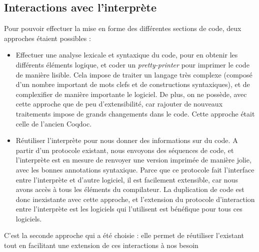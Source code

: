 \documentclass[a4paper, 11pt]{report}
\begin{document}
    \subsection{Interactions avec l'interprète}
    Pour pouvoir effectuer la mise en forme des différentes sections de code,
    deux approches étaient possibles :
      \begin{itemize}
        \item Effectuer une analyse lexicale et syntaxique du code, pour
          en obtenir les différents éléments logique, et coder un
          \textit{pretty-printer} pour imprimer le code de manière lisible.
          Cela impose de traiter un langage très complexe (composé d'un nombre
          important de mots clefs et de constructions syntaxiques), et de
          complexifier de manière importante le logiciel. De plus, on ne
          possède, avec cette approche que de peu d'extensibilité, car rajouter
          de nouveaux traitements impose de grands changements dans le code.
          Cette approche était celle de l'ancien Coqdoc.
        \item Réutiliser l'interprète pour nous donner des informations sur
          du code. A partir d'un protocole existant, nous envoyons des séquences
          de code, et l'interprète est en mesure de renvoyer une version imprimée
          de manière jolie, avec les bonnes annotations syntaxique.
          Parce que ce protocole fait l'interface entre l'interprète et d'autre
          logiciel, il est facilement extensible, car nous avons accès à tous
          les éléments du compilateur. La duplication de code est donc inexistante
          avec cette approche, et l'extension du protocole d'interaction entre
          l'interprète est les logiciels qui l'utilisent est bénéfique pour tous
          ces logiciels.
      \end{itemize}
    C'est la seconde approche qui a été choisie : elle permet de réutiliser
    l'existant tout en facilitant une extension de ces interactions à nos besoin
\end{document}
